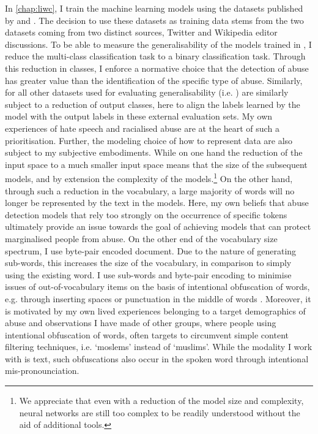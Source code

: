 In \autoref{chap:liwc}, I train the machine learning models using the datasets published by \citet{Davidson:2017} and \citet{Wulczyn:2016}. The decision to use these datasets as training data stems from the two datasets coming from two distinct sources, Twitter and Wikipedia editor discussions.
To be able to measure the generalisability of the models trained in \citet{Davidson:2017}, I reduce the multi-class classification task to a binary classification task. Through this reduction in classes, I enforce a normative choice that the detection of abuse has greater value than the identification of the specific type of abuse. Similarly, for all other datasets used for evaluating generalisability (i.e. \citet{Waseem:2016,Waseem-Hovy:2016,Gibert:2018}) are similarly subject to a reduction of output classes, here to align the labels learned by the model with the output labels in these external evaluation sets. My own experiences of hate speech and racialised abuse are at the heart of such a prioritisation.
Further, the modeling choice of how to represent data are also subject to my subjective embodiments. While on one hand the reduction of the input space to a much smaller input space means that the size of the subsequent models, and by extension the complexity of the models.\footnote{We appreciate that even with a reduction of the model size and complexity, neural networks are still too complex to be readily understood without the aid of additional tools.} On the other hand, through such a reduction in the vocabulary, a large majority of words will no longer be represented by the text in the models. Here, my own beliefs that abuse detection models that rely too strongly on the occurrence of specific tokens ultimately provide an issue towards the goal of achieving models that can protect marginalised people from abuse. On the other end of the vocabulary size spectrum, I use byte-pair encoded document. Due to the nature of generating sub-words, this increases the size of the vocabulary, in comparison to simply using the existing word. I use sub-words and byte-pair encoding to minimise issues of out-of-vocabulary items on the basis of intentional obfuscation of words, e.g. through inserting spaces or punctuation in the middle of words \citep{Rottger:2021}. Moreover, it is motivated by my own lived experiences belonging to a target demographics of abuse and observations I have made of other groups, where people using intentional obfuscation of words, often targets to circumvent simple content filtering techniques, i.e. `moslems' instead of `muslims'. While the modality I work with is text, such obfuscations also occur in the spoken word through intentional mis-pronounciation.

